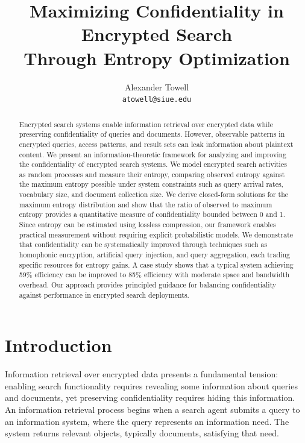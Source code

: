 \documentclass[final,11pt]{article}
\title
{
    Maximizing Confidentiality in Encrypted Search\\
    Through Entropy Optimization
}
\author
{
    Alexander Towell\\
    \texttt{atowell@siue.edu}
}
\date{}
\numberwithin{equation}{section}
\theoremstyle{plain}
\theoremstyle{remark}
\begin{document}
\maketitle
\begin{abstract}
Encrypted search systems enable information retrieval over encrypted data while preserving confidentiality of queries and documents. However, observable patterns in encrypted queries, access patterns, and result sets can leak information about plaintext content. We present an information-theoretic framework for analyzing and improving the confidentiality of encrypted search systems. We model encrypted search activities as random processes and measure their entropy, comparing observed entropy against the maximum entropy possible under system constraints such as query arrival rates, vocabulary size, and document collection size. We derive closed-form solutions for the maximum entropy distribution and show that the ratio of observed to maximum entropy provides a quantitative measure of confidentiality bounded between 0 and 1. Since entropy can be estimated using lossless compression, our framework enables practical measurement without requiring explicit probabilistic models. We demonstrate that confidentiality can be systematically improved through techniques such as homophonic encryption, artificial query injection, and query aggregation, each trading specific resources for entropy gains. A case study shows that a typical system achieving 59\% efficiency can be improved to 85\% efficiency with moderate space and bandwidth overhead. Our approach provides principled guidance for balancing confidentiality against performance in encrypted search deployments.
\end{abstract}

\tableofcontents
\listoftables
\listoffigures
\listofalgorithms

\section{Introduction}
Information retrieval over encrypted data presents a fundamental tension: enabling search functionality requires revealing some information about queries and documents, yet preserving confidentiality requires hiding this information. An information retrieval process begins when a search agent submits a query to an information system, where the query represents an information need. The system returns relevant objects, typically documents, satisfying that need.
\end{document}
